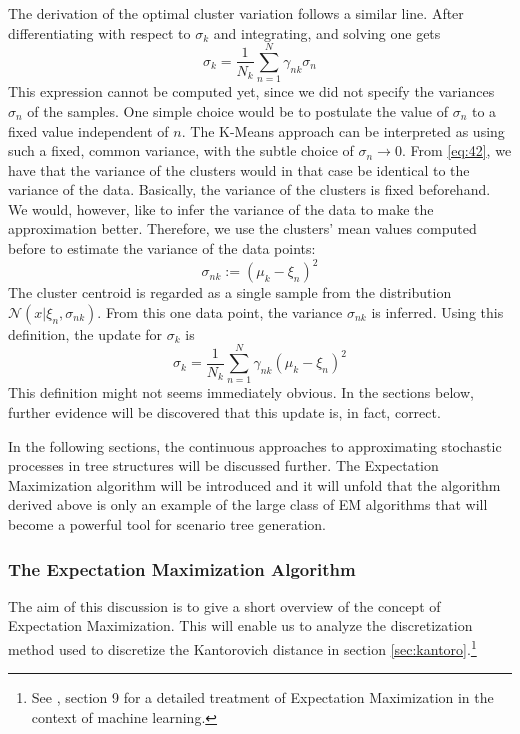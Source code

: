 The derivation of the optimal cluster variation follows a similar line.
After differentiating with respect to $\sigma_k$ and integrating, and solving one gets
\begin{equation}
  \label{eq:42}
  \sigma_k = \frac{1}{N_k}\sum_{n=1}^N \gamma_{nk}\sigma_n
\end{equation}
This expression cannot be computed yet, since we did not specify the variances $\sigma_n$ of the samples.
One simple choice would be to postulate the value of $\sigma_n$ to a fixed value independent of $n$.
The K-Means approach can be interpreted as using such a fixed, common variance, with the subtle choice of $\sigma_n\rightarrow 0$.
From \eqref{eq:42}, we have that the variance of the clusters would in that case be identical to the variance of the data.
Basically, the variance of the clusters is fixed beforehand.
We would, however, like to infer the variance of the data to make the approximation better.
Therefore, we use the clusters' mean values computed before to estimate the variance of the data points:
\begin{equation}
  \label{eq:43}
  \sigma_{nk} := (\mu_k-\xi_n)^2
\end{equation}
The cluster centroid is regarded as a single sample from the distribution $\mathcal{N}(x|\xi_n, \sigma_{nk})$.
From this one data point, the variance $\sigma_{nk}$ is inferred.
Using this definition, the update for $\sigma_k$ is
\begin{equation}
  \label{eq:44}
  \sigma_k = \frac{1}{N_k}\sum_{n=1}^N \gamma_{nk}(\mu_k-\xi_n)^2
\end{equation}
This definition might not seems immediately obvious.
In the sections below, further evidence will be discovered that this update is, in fact, correct.
%

In the following sections, the continuous approaches to approximating stochastic processes in tree structures will be discussed further.
The Expectation Maximization algorithm will be introduced and it will unfold that the algorithm derived above is only an example of the large class of EM algorithms that will become a powerful tool for scenario tree generation.
\subsubsection{The Expectation Maximization Algorithm}
The aim of this discussion is to give a short overview of the concept of Expectation Maximization.
This will enable us to analyze the discretization method used to discretize the Kantorovich distance in section \ref{sec:kantoro}.\footnote{See \cite{Bishop2006}, section 9 for a detailed treatment of Expectation Maximization in the context of machine learning.}

